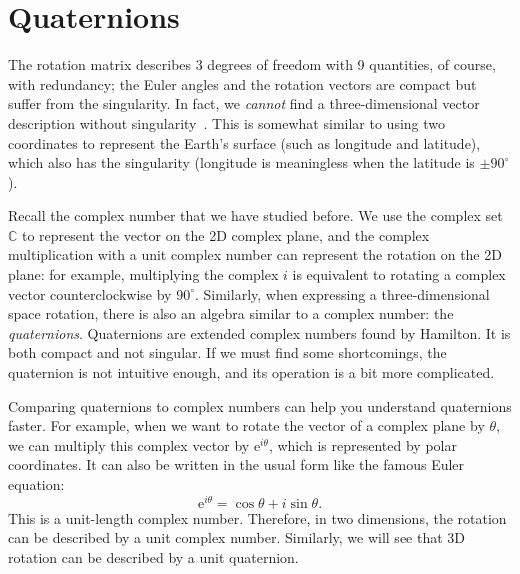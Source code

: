 \section{Quaternions}
The rotation matrix describes 3 degrees of freedom with 9 quantities, of course, with redundancy; the Euler angles and the rotation vectors are compact but suffer from the singularity. In fact, we \textit{cannot} find a three-dimensional vector description without singularity~\cite{Stuelpnagel1964}. This is somewhat similar to using two coordinates to represent the Earth's surface (such as longitude and latitude), which also has the singularity (longitude is meaningless when the latitude is $ \pm  90 ^ \circ $ ).

Recall the complex number that we have studied before. We use the complex set $ \mathbb {C} $ to represent the vector on the 2D complex plane, and the complex multiplication with a unit complex number can represent the rotation on the 2D plane: for example, multiplying the complex $i$ is equivalent to rotating a complex vector counterclockwise by $ 90 ^ \circ $. Similarly, when expressing a three-dimensional space rotation, there is also an algebra similar to a complex number: the \textit{quaternions}. Quaternions are extended complex numbers found by Hamilton. It is both compact and not singular. If we must find some shortcomings, the quaternion is not intuitive enough, and its operation is a bit more complicated.

Comparing quaternions to complex numbers can help you understand quaternions faster. For example, when we want to rotate the vector of a complex plane by $\theta$, we can multiply this complex vector by $\mathrm{e}^{i \theta}$, which is represented by polar coordinates. It can also be written in the usual form like the famous Euler equation:
\begin{equation}
\mathrm{e}^{i\theta} = \cos \theta + i \sin \theta.
\end{equation}
This is a unit-length complex number. Therefore, in two dimensions, the rotation can be described by a unit complex number. Similarly, we will see that 3D rotation can be described by a unit quaternion.

